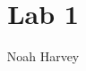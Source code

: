 \documentclass[a4paper,titlepage]{article}
\begin{document}
	\title{Lab 1}
	\author{Noah Harvey}
	\maketitle

	\tableofcontents
	\listoftables
	\listoffigures

	\pagebreak

	

\end{document}
